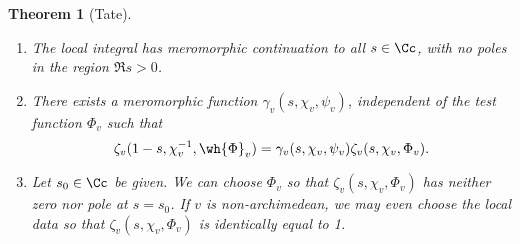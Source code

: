 \documentclass{article}
\newtheorem{theorem}{Theorem}[section]
\begin{document}
\begin{theorem}[Tate]
\label{tate}
\begin{enumerate}
\item The local integral has meromorphic continuation to all $s\in\Cc$, with no poles in the region $\Re s > 0$. 
\item There exists a meromorphic function $\gamma_{v}(s, \chi_{v}, \psi_{v})$, independent of the test function $\Phi_{v}$ such that 
$$
\zeta_{v}(1-s, \chi_{v}^{-1}, \wh{\Phi}_{v}) = \gamma_{v}(s, \chi_{v}, \psi_{v}) \zeta_{v}(s, \chi_{v}, \Phi_{v}).
$$
\item Let $s_{0}\in \Cc$ be given. We can choose $\Phi_{v}$ so that $\zeta_{v}(s, \chi_{v}, \Phi_{v})$ has neither zero nor pole at $s = s_{0}$. If $v$ is non-archimedean, we may even choose the local data so that $\zeta_{v}(s, \chi_{v}, \Phi_{v})$ is identically equal to 1. 
\end{enumerate}
\end{theorem}
\end{document}
